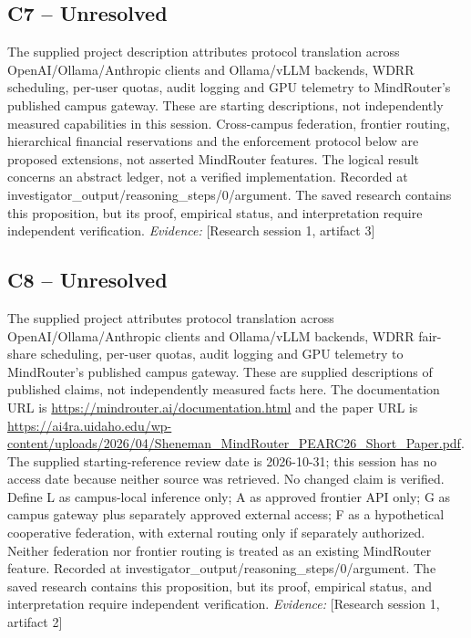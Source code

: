 \documentclass[11pt]{article}
\begin{document}
\subsection{C7 -- Unresolved}
The supplied project description attributes protocol translation across OpenAI/Ollama/Anthropic clients and Ollama/vLLM backends, WDRR scheduling, per-user quotas, audit logging and GPU telemetry to MindRouter's published campus gateway. These are starting descriptions, not independently measured capabilities in this session. Cross-campus federation, frontier routing, hierarchical financial reservations and the enforcement protocol below are proposed extensions, not asserted MindRouter features. The logical result concerns an abstract ledger, not a verified implementation.
Recorded at investigator\_output/reasoning\_steps/0/argument. The saved research contains this proposition, but its proof, empirical status, and interpretation require independent verification.
\textit{Evidence: }[Research session 1, artifact 3]
\subsection{C8 -- Unresolved}
The supplied project attributes protocol translation across OpenAI/Ollama/Anthropic clients and Ollama/vLLM backends, WDRR fair-share scheduling, per-user quotas, audit logging and GPU telemetry to MindRouter's published campus gateway. These are supplied descriptions of published claims, not independently measured facts here. The documentation URL is \url{https://mindrouter.ai/documentation.html} and the paper URL is \url{https://ai4ra.uidaho.edu/wp-content/uploads/2026/04/Sheneman_MindRouter_PEARC26_Short_Paper.pdf}. The supplied starting-reference review date is 2026-10-31; this session has no access date because neither source was retrieved. No changed claim is verified. Define L as campus-local inference only; A as approved frontier API only; G as campus gateway plus separately approved external access; F as a hypothetical cooperative federation, with external routing only if separately authorized. Neither federation nor frontier routing is treated as an existing MindRouter feature.
Recorded at investigator\_output/reasoning\_steps/0/argument. The saved research contains this proposition, but its proof, empirical status, and interpretation require independent verification.
\textit{Evidence: }[Research session 1, artifact 2]
\end{document}

